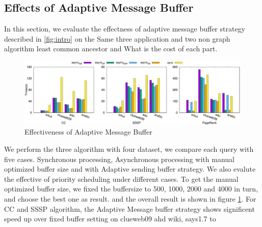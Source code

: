 \subsection{Effects of Adaptive Message Buffer}
\label{sec:expr:AMBuffer}
In this section, we evaluate the effectness of adaptive message buffer strategy described in \ref{fig:intro} on the Same three application and two non graph algorithm least common ancestor\cite{} and What is the cost of each part\cite{}.

\begin{figure}[!t]
	\vspace{0.0in}
	\centering
	\includegraphics[width=6.6in]{figuration/summary.eps}
	\vspace{-0.1in}
	\caption{Effectiveness of Adaptive Message Buffer}
	\label{fig:summary}
	\vspace{-0.1in}
\end{figure}
We perform the three algorithm with four dataset, we compare each query with five cases. Synchronous processing, Asynchronous processing with manual optimized buffer size and with Adaptive sending buffer strategy. We also evalute the effective of priority scheduling under different cases. To get the manual optimized buffer size, we fixed the buffersize to 500, 1000, 2000 and 4000 in turn, and choose the best one as result.  and the overall result is shown in figure \ref{fig:summary}.
For CC and SSSP algorithm, the Adaptive Message buffer strategy shows significent speed up over fixed buffer setting on clueweb09 ahd wiki, says1.7 to   


